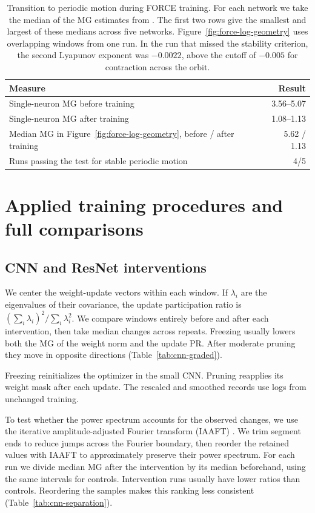 {\begin{table}[htbp]
\centering\small
\caption{Transition to periodic motion during FORCE training. For each network we take the median of the MG estimates from . The first two rows give the smallest and largest of these medians across five networks. Figure~\ref{fig:force-log-geometry} uses overlapping windows from one run. In the run that missed the stability criterion, the second Lyapunov exponent was $-0.0022$, above the cutoff of $-0.005$ for contraction across the orbit.}
\label{tab:force-outcome}
\begin{tabular}{lr}
\toprule
Measure & Result \\
\midrule
Single-neuron MG before training & 3.56--5.07 \\
Single-neuron MG after training & 1.08--1.13 \\
Median MG in Figure~\ref{fig:force-log-geometry}, before / after training & 5.62 / 1.13 \\
Runs passing the test for stable periodic motion & 4/5 \\
\bottomrule
\end{tabular}
\end{table}

\section{Applied training procedures and full comparisons}\label{app:applied}
\subsection{CNN and ResNet interventions}
We center the weight-update vectors within each window. If $\lambda_i$ are the eigenvalues of their covariance, the update participation ratio is $(\sum_i\lambda_i)^2/\sum_i\lambda_i^2$.
We compare windows entirely before and after each intervention, then take median changes across repeats. Freezing usually lowers both the MG of the weight norm and the update PR. After moderate pruning they move in opposite directions (Table~\ref{tab:cnn-graded}).

Freezing reinitializes the optimizer in the small CNN. Pruning reapplies its weight mask after each update. The rescaled and smoothed records use logs from unchanged training.

To test whether the power spectrum accounts for the observed changes, we use the iterative amplitude-adjusted Fourier transform (IAAFT) \citep{schreiber1996improved}. We trim segment ends to reduce jumps across the Fourier boundary, then reorder the retained values with IAAFT to approximately preserve their power spectrum. For each run we divide median MG after the intervention by its median beforehand, using the same intervals for controls. Intervention runs usually have lower ratios than controls. Reordering the samples makes this ranking less consistent (Table~\ref{tab:cnn-separation}).

}
